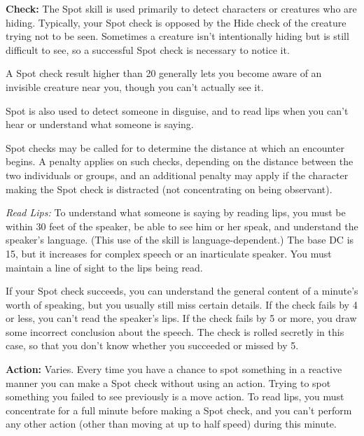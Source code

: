 \textbf{Check:} The Spot skill is used primarily to detect characters or creatures who are hiding. Typically, your Spot check is opposed by the Hide check of the creature trying not to be seen. Sometimes a creature isn't intentionally hiding but is still difficult to see, so a successful Spot check is necessary to notice it.

A Spot check result higher than 20 generally lets you become aware of an invisible creature near you, though you can't actually see it.

Spot is also used to detect someone in disguise, and to read lips when you can't hear or understand what someone is saying.

Spot checks may be called for to determine the distance at which an encounter begins. A penalty applies on such checks, depending on the distance between the two individuals or groups, and an additional penalty may apply if the character making the Spot check is distracted (not concentrating on being observant).


\textit{Read Lips:} To understand what someone is saying by reading lips, you must be within 30 feet of the speaker, be able to see him or her speak, and understand the speaker's language. (This use of the skill is language-dependent.) The base DC is 15, but it increases for complex speech or an inarticulate speaker. You must maintain a line of sight to the lips being read.

If your Spot check succeeds, you can understand the general content of a minute's worth of speaking, but you usually still miss certain details. If the check fails by 4 or less, you can't read the speaker's lips. If the check fails by 5 or more, you draw some incorrect conclusion about the speech. The check is rolled secretly in this case, so that you don't know whether you succeeded or missed by 5.

\textbf{Action:} Varies. Every time you have a chance to spot something in a reactive manner you can make a Spot check without using an action. Trying to spot something you failed to see previously is a move action. To read lips, you must concentrate for a full minute before making a Spot check, and you can't perform any other action (other than moving at up to half speed) during this minute.

